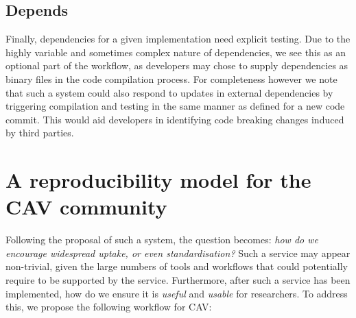 \documentclass{llncs}
\begin{document}
\subsection{Depends}
Finally, dependencies for a given implementation need explicit
testing. Due to the highly variable and sometimes complex nature of
dependencies, we see this as an optional part of the workflow, as
developers may chose to supply dependencies as binary files in the
code compilation process. For completeness however we note that such a
system could also respond to updates in external dependencies by
triggering compilation and testing in the same manner as defined for a
new code commit. This would aid developers in identifying code
breaking changes induced by third parties.


\section{A reproducibility model for the CAV community}\label{rollout}

Following the proposal of such a system, the question becomes:
{\emph{how do we encourage widespread uptake, or even standardisation?}}
Such a service may appear non-trivial, given the large numbers of
tools and workflows
that could potentially require to be supported by the service. Furthermore,
after such a service has been implemented, how do we ensure it is
\emph{useful} and \emph{usable} for researchers. To address this, we
propose the following workflow for CAV:
\end{document}
